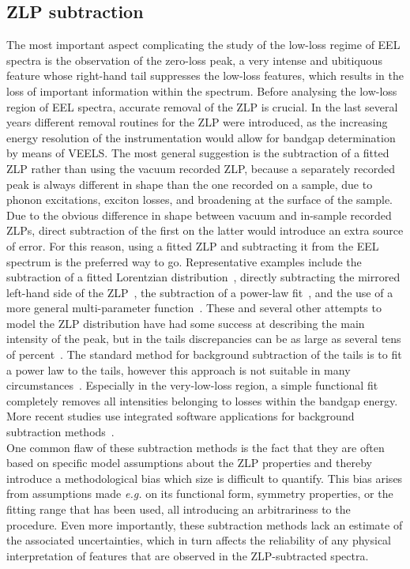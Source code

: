 \subsection{ZLP subtraction}

The most important aspect complicating the study of the low-loss regime of EEL spectra 
is the observation of the zero-loss peak, a very intense and ubitiquous feature 
whose right-hand tail suppresses the low-loss features, which results in the loss
of important information within the spectrum.
%
Before analysing the low-loss region of EEL spectra, accurate removal of the
ZLP is crucial. 
%
In the last several years different removal routines for the ZLP were introduced, 
as the increasing energy resolution of the instrumentation would allow for bandgap 
determination by means of VEELS. 
%
The most general suggestion is the subtraction of a fitted ZLP rather than 
using the vacuum recorded ZLP, because a separately recorded peak is always 
different in shape than the one recorded on a sample, due to phonon excitations, 
exciton losses, and broadening at the surface of the sample.
%
Due to the obvious difference in shape between vacuum and in-sample recorded ZLPs, 
direct subtraction of the first on the latter would introduce an extra
source of error. 
%
For this reason, using a fitted ZLP and subtracting it from the EEL spectrum 
is the preferred way to go.
%
Representative examples include the subtraction of a fitted Lorentzian distribution~\cite{Dorneich:1998},
directly subtracting the mirrored left-hand side of the ZLP~\cite{Lazar:2003},
the subtraction of a power-law fit~\cite{Erni:2005}, and the use of a
more general multi-parameter function~\cite{Benthem:2001}.
%
These and several other attempts to model the ZLP distribution 
have had some success at describing the main intensity of the peak, 
but in the tails discrepancies can be as large as several tens of percent~\cite{Bangert:2003}.
%
The standard method for background subtraction of the tails
is to fit a power law to the tails, however this approach is not suitable in
many circumstances~\cite{Hachtel:2018, Tenailleau:1992, Reed:2002, Bosman:2006}.
%
Especially in the very-low-loss region, a simple functional fit completely
removes all intensities belonging to losses within the bandgap energy.
%
More recent studies use integrated software applications for background subtraction 
methods~\cite{Egerton:10.1016/S0304-3991(01)00155-3, Held:2020, Granerod:2018, Fung:2020}.\\

One common flaw of these subtraction methods is the fact that they are often based on specific
model assumptions about the ZLP properties and thereby introduce a methodological
bias which size is difficult to quantify. 
%
This bias arises from assumptions made {\it e.g.} on its functional form, symmetry 
properties, or the fitting range that has been used, all introducing an arbitrariness
to the procedure.
%
Even more importantly, these subtraction methods lack an estimate of the associated uncertainties, 
which in turn affects the reliability of any physical interpretation of features that are observed
in the ZLP-subtracted spectra. 

